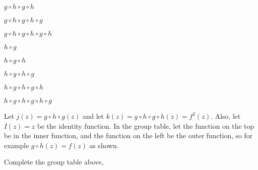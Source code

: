 \documentclass[../key.tex]{subfiles}
\begin{document}
\begin{inner_problem}
\item $g\circ h\circ g\circ h$
\end{inner_problem}

\begin{inner_problem}
\item $g\circ h\circ g\circ h\circ g$
\end{inner_problem}

\begin{inner_problem}
\item $g\circ h\circ g\circ h\circ g\circ h$
\end{inner_problem}

\begin{inner_problem}
\item $h\circ g$
\end{inner_problem}

\begin{inner_problem}
\item $h\circ g\circ h$
\end{inner_problem}

\begin{inner_problem}
\item $h\circ g\circ h\circ g$
\end{inner_problem}

\begin{inner_problem}
\item $h\circ g\circ h\circ g\circ h$
\end{inner_problem}

\begin{inner_problem}
\item $h\circ g\circ h\circ g\circ h\circ g$
\end{inner_problem}

\begin{outer_problem}
\item Let $j(z)=g\circ h\circ g(z)$ and let $k(z)=g\circ h\circ g\circ h(z)=f^2(z)$. Also, let $I(z)=z$ be the identity function. In the group table, let the function on the top be in the inner function, and the function on the left be the outer function, so for example $g\circ h(z)=f(z)$ as shown.
\end{outer_problem}

\begin{inner_problem}[start=1]
\item Complete the group table above,
\end{inner_problem}
\end{document}
